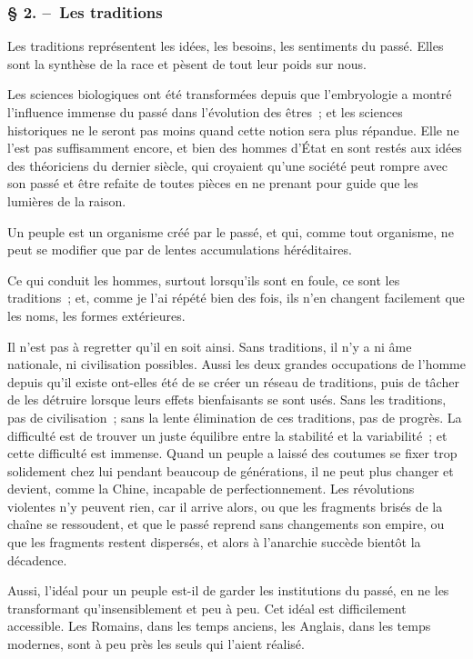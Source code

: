 \documentclass[french,twoside]{book} %
\begin{document}
\subsubsection[{§ 2. – Les traditions}]{§ 2. – Les traditions}
\noindent Les traditions représentent les idées, les besoins, les sentiments du passé. Elles sont la synthèse de la race et pèsent de tout leur poids sur nous.\par
Les sciences biologiques ont été transformées depuis que l’embryologie a montré l’influence immense du passé dans l’évolution des êtres ; et les sciences historiques ne le seront pas moins quand cette notion sera plus répandue. Elle ne l’est pas suffi­samment encore, et bien des hommes d’État en sont restés aux idées des théoriciens du dernier siècle, qui croyaient qu’une société peut rompre avec son passé et être refaite de toutes pièces en ne prenant pour guide que les lumières de la raison.\par
Un peuple est un organisme créé par le passé, et qui, comme tout organisme, ne peut se modifier que par de lentes accumulations héréditaires.\par
Ce qui conduit les hommes, surtout lorsqu’ils sont en foule, ce sont les traditions ; et, comme je l’ai répété bien des fois, ils n’en changent facilement que les noms, les formes extérieures.\par
Il n’est pas à regretter qu’il en soit ainsi. Sans traditions, il n’y a ni âme nationale, ni civilisation possibles. Aussi les deux grandes occupations de l’homme depuis qu’il existe ont-elles été de se créer un réseau de traditions, puis de tâcher de les détruire lorsque leurs effets bienfaisants se sont usés. Sans les traditions, pas de civilisation ; sans la lente élimination de ces traditions, pas de progrès. La difficulté est de trouver un juste équilibre entre la stabilité et la variabilité ; et cette difficulté est immense. Quand un peuple a laissé des coutumes se fixer trop solidement chez lui pendant beaucoup de générations, il ne peut plus changer et devient, comme la Chine, incapa­ble de perfectionnement. Les révolutions violentes n’y peuvent rien, car il arrive alors, ou que les fragments brisés de la chaîne se ressoudent, et que le passé reprend sans changements son empire, ou que les fragments restent dispersés, et alors à l’anar­chie succède bientôt la décadence.\par
Aussi, l’idéal pour un peuple est-il de garder les institutions du passé, en ne les transformant qu’insensiblement et peu à peu. Cet idéal est difficilement accessible. Les Romains, dans les temps anciens, les Anglais, dans les temps modernes, sont à peu près les seuls qui l’aient réalisé.\par
\end{document}
